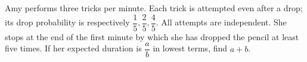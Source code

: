 Amy performs three tricks per minute. Each trick is attempted even after a drop; its drop probability is respectively $\dfrac{1}{5},\dfrac{2}{5},\dfrac{4}{5}$. All attempts are independent. She stops at the end of the first minute by which she has dropped the pencil at least five times. If her expected duration is $\dfrac{a}{b}$ in lowest terms, find $a+b$.
